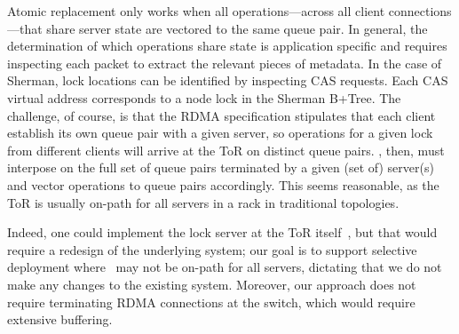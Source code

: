 



Atomic replacement only works when all operations---across all client
connections---that share server state are vectored to the same queue pair.  In
general, the determination of which operations share state is application
specific and requires inspecting each packet to extract the relevant pieces
of metadata. In the case of Sherman, lock locations can be identified by
inspecting CAS requests. Each CAS virtual address corresponds to a node lock in
the Sherman B+Tree.
The challenge, of course, is that the RDMA specification stipulates that each
client establish its own queue pair with a given server, so operations for a
given lock from different clients will arrive at the ToR on distinct queue
pairs.  \sword, then, must interpose on the full set of queue pairs terminated
by a given (set of) server(s) and vector operations to queue pairs accordingly.
This seems reasonable, as the ToR is usually on-path for all servers in a rack
in traditional topologies.

Indeed, one could implement the lock server at the ToR
itself~\cite{netlock}, but that would require a redesign of the
underlying system; our goal is to support selective deployment where
\sword\ may not be on-path for all servers, dictating that we do not
make any changes to the existing system.  Moreover, our approach does
not require terminating RDMA connections at the switch, which would
require extensive buffering.


